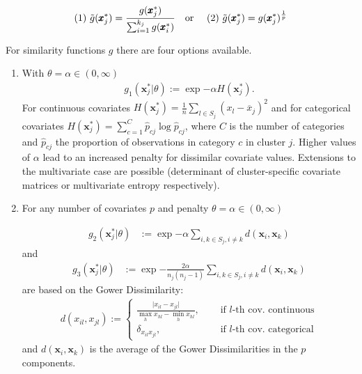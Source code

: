 \documentclass[12pt,a4paper]{article}
\begin{document}
\begin{align*}
    (1) \ \Tilde{g} (\pmb{x}_j^*) = \frac{g (\pmb{x}_j^*)}{\sum_{i=1}^{k_j} g(\pmb{x}_i^*)} \ \text{\ \ or \ \ } \ (2) \ \Tilde{g} (\pmb{x}_j^*) = g (\pmb{x}_j^*)^{\frac{1}{p}}
\end{align*}

For similarity functions $g$ there are four options available.\medskip

\begin{enumerate}
 \item With $\theta = \alpha \in (0, \infty)$
    \begin{align*}
        g_1( \pmb{x}_j^* \vert \theta ) := \exp{- \alpha H (\pmb{x}_j^*) }.
    \end{align*}
    For continuous covariates $
    H(\pmb{x}_j^*)= \frac{1}{n} \sum_{l \in S_j} (x_l - \overline{x}_j)^2$ and for categorical covariates $H(\pmb{x}_j^*)= \sum_{c=1}^C \hat{p}_{cj} \log{\hat{p}_{cj}}$, where $C$ is the number of categories and $\hat{p}_{cj}$ the proportion of observations in category $c$ in cluster $j$.
    Higher values of $\alpha$ lead to an increased penalty for dissimilar covariate values. Extensions to the multivariate case are possible (determinant of cluster-specific covariate matrices or multivariate entropy respectively). \medskip

    \item For any number of covariates $p$ and penalty $\theta = \alpha \in (0, \infty)$

    \begin{align*}
        g_2( \pmb{x}_j^* \vert \theta) &:= \exp{- \alpha \sum_{i,k \in S_j, i \neq k} d(\pmb{x}_i, \pmb{x}_k ) }
    \end{align*}
    and
    \begin{align*}
        g_3( \pmb{x}_j^* \vert \theta) &:= \exp{- \frac{2 \alpha}{n_j (n_j - 1)} \sum_{i,k \in S_j, i \neq k} d(\pmb{x}_i, \pmb{x}_k ) }
    \end{align*}
    are based on the Gower Dissimilarity:
    \begin{align*}
        d(x_{il}, x_{jl}) := \begin{cases}
            \frac{\vert x_{il} - x_{jl} \vert}{\max_h x_{hl} - \min_h x_{hl}}, &\quad \text{ if } l \text{-th cov. continuous}\\
            \delta_{x_{il} x_{jl}}, &\quad \text{ if } l \text{-th cov. categorical}
        \end{cases}
    \end{align*}
    and $d(\pmb{x}_i, \pmb{x}_k )$ is the average of the Gower Dissimilarities in the $p$ components. \medskip


\end{enumerate}
\end{document}
